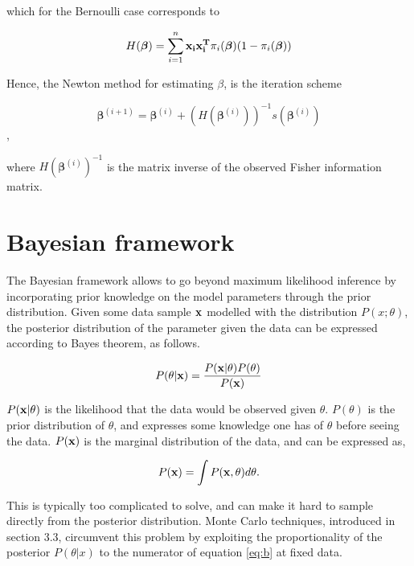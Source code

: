which for the Bernoulli case corresponds to

\begin{equation}
    H(\bm{\beta}) = \sum_{i=1}^{n} {\bf x_i x_i^T} \pi_i(\bm{\beta}) (1-\pi_i(\bm{\beta}))
\end{equation}

Hence, the Newton method for estimating $\beta$, is the iteration scheme

\begin{equation}
\label{eq:Newton}
    \bm{\beta}^{(i+1)} = \bm{\beta}^{(i)} + (H(\bm{\beta}^{(i)}))^{-1} s(\bm{\beta}^{(i)})
\end{equation},

where $H(\bm{\beta}^{(i)})^{-1}$ is the matrix inverse of the observed Fisher information matrix.



\section{Bayesian framework}
\label{BayesianFW}

The Bayesian framework allows to go beyond maximum likelihood inference by incorporating prior knowledge on the model parameters through the prior distribution. Given some data sample ${\bf x}$ modelled with the distribution $P(x;\theta)$, the posterior distribution of the parameter given the data can be expressed according to Bayes theorem, as follows.

\begin{equation}
\label{eq:b}
    P(\theta | {\bf x}) = \frac{P({ \bf x}|\theta)P(\theta)}{P({\bf x})}
\end{equation}

$P({\bf x}|\theta)$ is the likelihood that the data would be observed given $\theta$. $P(\theta)$ is the prior distribution of $\theta$, and expresses some knowledge one has of $\theta$ before seeing the data. $P({\bf x})$ is the marginal distribution of the data, and can be expressed as,

\begin{equation}
    P({\bf x}) = \int P({\bf x},\theta)d\theta.
\end{equation}

This is typically too complicated to solve, and can make it hard to sample directly from the posterior distribution. Monte Carlo techniques, introduced in section 3.3, circumvent this problem by exploiting the proportionality of the posterior $P(\theta\vert x)$ to the numerator of equation \ref{eq:b} at fixed data.

